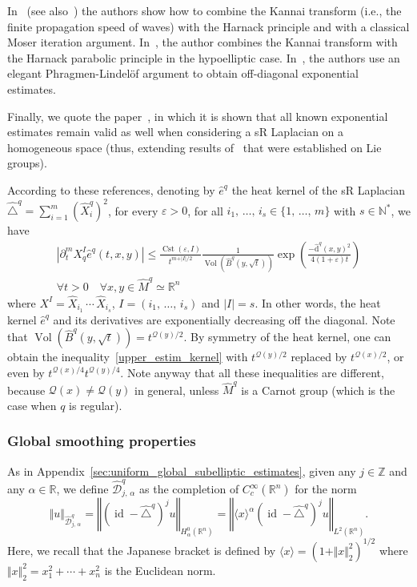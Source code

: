 \documentclass[AHL,Unicode,published]{cedram}
\newcommand*\R{\mathbb{R}}
\newcommand*\N{\mathbb{N}}
\newcommand*\Z{\mathbb{Z}}
\newcommand{\calQ}{\mathcal{Q}}
\newcommand{\calD}{\mathcal{D}}
\newcommand{\rmd}{\mathrm{d}}
\DeclareMathOperator{\Cst}{Cst}
\DeclareMathOperator{\id}{id}
\DeclareMathOperator{\Vol}{Vol}
\renewcommand{\leq}{\leqslant}
\let\oldforall\forall
\renewcommand*{\forall}{\mathrel{\oldforall}}
\begin{document}
In~\cite{CheegerGromovTaylor_1982} (see also~\cite{Me-84}) the authors show how to combine the Kannai transform (i.e., the finite propagation speed of waves) with the Harnack principle and with a classical Moser iteration argument. In~\cite{Saloff-Coste_IMRN1992}, the author combines the Kannai transform with the Harnack parabolic principle in the hypoelliptic case. In~\cite{CoulhonSikora_PLMS2008}, the authors use an elegant Phragmen-Lindel\"of argument to obtain off-diagonal exponential estimates.

Finally, we quote the paper~\cite{Maheux_JGA1998}, in which it is shown that all known exponential estimates remain valid as well when considering a sR Laplacian on a homogeneous space (thus, extending results of~\cite{Varopoulos} that were established on Lie groups).

According to these references, denoting by $\widehat{e}^q$ the heat kernel of the sR Laplacian $\widehat{\triangle}^q=\sum_{i=1}^m (\widehat{X}_i^q)^2$, for every $\varepsilon>0$, for all $i_1,\,\ldots,\,i_s\in\{1,\,\ldots,\,m\}$ with $s\in\N^*$, we have
\begin{multline}\label{upper_estim_kernel}
\left\vert \partial_t^m X_q^I \widehat{e}^q(t,x,y) \right\vert \leq \frac{\Cst(\varepsilon,I)}{t^{m+\vert I\vert/2}} \frac{1}{\Vol\left(\widehat{B}^q\left(y,\sqrt{t}\right)\right)} \exp \left(\frac{-\widehat{\rmd}^q(x,y)^2}{4(1+\varepsilon)t} \right) \\
\forall t>0\quad\forall x,y\in\widehat{M}^q\simeq\R^n
\end{multline}
where $X^I = \widehat{X}_{i_1}\,\cdots\,\widehat{X}_{i_s}$, $I=(i_1,\,\ldots,\,i_s)$ and $\vert I\vert=s$. In other words, the heat kernel $\widehat{e}^q$ and its derivatives are exponentially decreasing off the diagonal. Note that $\Vol(\widehat{B}^q(y,\sqrt{t}))=t^{\calQ(y)/2}$. By symmetry of the heat kernel, one can obtain the inequality~\eqref{upper_estim_kernel} with $t^{\calQ(y)/2}$ replaced by $t^{\calQ(x)/2}$, or even by $t^{\calQ(x)/4}t^{\calQ(y)/4}$. Note anyway that all these inequalities are different, because $\calQ(x)\neq \calQ(y)$ in general, unless $\widehat{M}^q$ is a Carnot group (which is the case when $q$ is regular).



\subsubsection{Global smoothing properties}
As in Appendix~\ref{sec:uniform_global_subelliptic_estimates}, given any $j\in\Z$ and any $\alpha\in\R$, we define $\widehat{\calD}^q_{j,\,\alpha}$ as the completion of $C_c^\infty(\R^n)$ for the norm
\[
\Vert u\Vert_{\widehat{\calD}^q_{j,\,\alpha}} = \left\Vert \left(\id - \widehat{\triangle}^q\right)^j u\right\Vert_{H^0_\alpha\left(\R^n\right)} = \left\Vert \langle x\rangle^\alpha\left(\id - \widehat{\triangle}^q\right)^j u\right\Vert_{L^2\left(\R^n\right)}.
\]
Here, we recall that the Japanese bracket is defined by $\langle x\rangle = (1+\Vert x\Vert_2^2)^{1/2}$ where $\Vert x\Vert_2^2=x_1^2+\cdots+x_n^2$ is the Euclidean norm.
\end{document}
